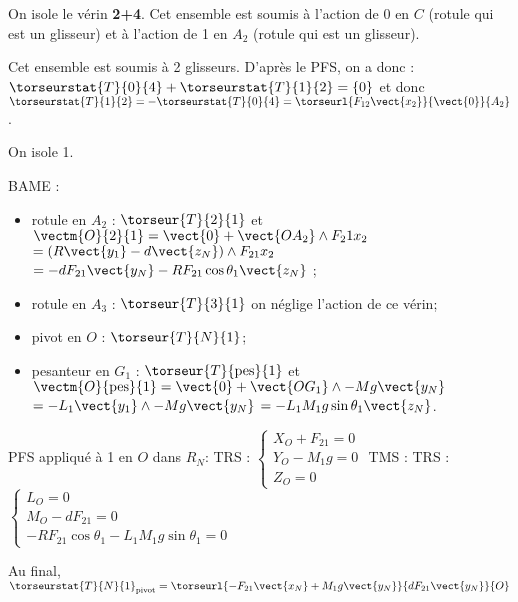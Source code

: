 \ifprof
\begin{corrige}
On isole le vérin \textbf{2+4}. Cet ensemble est soumis à l'action de 0 en $C$ (rotule qui est un glisseur)
et à l'action de 1 en $A_2$ (rotule qui est un glisseur). 

Cet ensemble est soumis à 2 glisseurs. D'après le PFS, on a donc : 
$\torseurstat{T}{0}{4} + \torseurstat{T}{1}{2} =\{0\}$ et donc 
$\torseurstat{T}{1}{2} = - \torseurstat{T}{0}{4} = \torseurl{F_{12}\vect{x_2}}{\vect{0}}{A_2} $.

\end{corrige}
\else
\fi


\ifprof
\begin{corrige}
On isole 1.

BAME : 
\begin{itemize}
\item rotule en $A_2$ : $\torseur{T}{2}{1}$ et $\vectm{O}{2}{1} = \vect{0}+\vect{OA_2}\wedge F_21{x_2}$ $=\left(R\vect{y_1} - d \vect{z_N}\right)\wedge F_{21}{x_2}$ $=-dF_{21}\vect{y_N}-RF_{21}\cos\theta_1 \vect{z_N}$ ;
\item rotule en $A_3$ : $\torseur{T}{3}{1}$ on néglige l'action de ce vérin;
\item pivot en $O$ : $\torseur{T}{N}{1}$;
\item pesanteur en $G_1$ : $\torseur{T}{\text{pes}}{1}$ et $\vectm{O}{\text{pes}}{1} = \vect{0}+\vect{OG_1}\wedge -Mg\vect{y_N}$ $=-L_1\vect{y_1}\wedge -Mg\vect{y_N}$ $=-L_1M_1g\sin\theta_1 \vect{z_N}$.
\end{itemize}

PFS appliqué à 1 en $O$  dans $R_N$:
TRS : 
$\left\{ \begin{array}{l}
X_O + F_{21} = 0 \\
Y_O - M_1 g = 0 \\
Z_O = 0
\end{array}
\right.$
TMS : TRS : 
$\left\{ \begin{array}{l}
L_O = 0 \\
M_O - dF_{21} = 0 \\
-RF_{21}\cos\theta_1  -L_1M_1g\sin\theta_1= 0
\end{array}
\right.$

Au final, $\torseurstat{T}{N}{1}_{\text{pivot}} = \torseurl{-F_{21}\vect{x_N}+M_1 g\vect{y_N} }{dF_{21} \vect{y_N}}{O}$
\end{corrige}
\else
\fi

